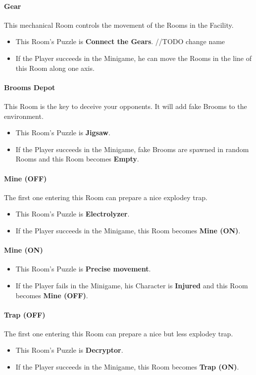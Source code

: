 \paragraph{Gear} This mechanical Room controls the movement of the Rooms in the Facility.
\begin{itemize}
	\item This Room's Puzzle is \textbf{Connect the Gears}. //TODO change name
	\item If the Player succeeds in the Minigame, he can move the Rooms in the line of this Room along one axis.
\end{itemize}

\paragraph{Brooms Depot} This Room is the key to deceive your opponents. It will add fake Brooms to the environment.
\begin{itemize}
	\item This Room's Puzzle is \textbf{Jigsaw}.
	\item If the Player succeeds in the Minigame, fake Brooms are spawned in random Rooms and this Room becomes \textbf{Empty}.
\end{itemize}

\paragraph{Mine (OFF)} The first one entering this Room can prepare a nice explodey trap.
\begin{itemize}
	\item This Room's Puzzle is \textbf{Electrolyzer}.
	\item If the Player succeeds in the Minigame, this Room becomes \textbf{Mine (ON)}.
\end{itemize}

\paragraph{Mine (ON)}
\begin{itemize}
	\item This Room's Puzzle is \textbf{Precise movement}.
	\item If the Player fails    in the Minigame, his Character is \textbf{Injured} and this Room becomes \textbf{Mine (OFF)}.
\end{itemize}

\paragraph{Trap (OFF)} The first one entering this Room can prepare a nice but less explodey trap.
\begin{itemize}
	\item This Room's Puzzle is \textbf{Decryptor}.
	\item If the Player succeeds in the Minigame, this Room becomes \textbf{Trap (ON)}.
\end{itemize}

